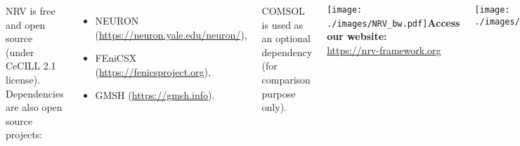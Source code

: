 \documentclass{NRVposter}
\begin{document}
\begin{columns}
{NRV is free and open source (under CeCILL 2.1 license). Dependencies are also open source projects:
\begin{itemize}
    \item NEURON (\url{https://neuron.yale.edu/neuron/}),
    \item FEniCSX (\url{https://fenicsproject.org}),
    \item GMSH (\url{https://gmsh.info}).
\end{itemize}
COMSOL is used as an optional dependency (for comparison purpose only).\\
\vspace{0.01\textheight}
}

 

{
    \texttt{[image: ./images/NRV\_bw.pdf]}\textbf{Access our website:} \\ \url{https://nrv-framework.org}\\
            \begin{center}
                \texttt{[image: ./images/qrcode\_website.png]}
            \end{center}
            and enter the forum for help (community page)\\
\texttt{[image: ./images/github\_logo.png]} \textbf{Access the source code:} \\ \url{https://github.com/nrv-framework/NRV}\\
            \begin{center}
                \texttt{[image: ./images/qrcode\_github.png]}
            \end{center}
\texttt{[image: ./images/pypi\_logo.png]} \textbf{Get the installer:} \\ \url{https://pypi.org/project/nrv-py/}\\
        \begin{center}
            \texttt{[image: ./images/qrcode\_pypi.png]}
        \end{center}
\texttt{[image: ./images/rtd\_logo.png]} \textbf{Get the documentation:} \\ \url{https://nrv.readthedocs.io/en/latest/}\\
        \begin{center}
            \texttt{[image: ./images/qrcode\_rtd.png]}
        \end{center}

}
\end{columns}
\end{document}
